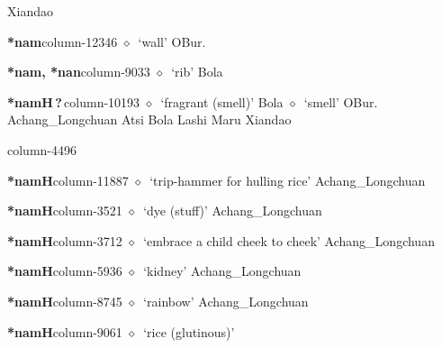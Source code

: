          Xiandao 
  \item {\footnotesize \textbf{*nam}}{\tiny column-12346}
         $\diamond$~`wall'
         OBur. 
  \item {\footnotesize \textbf{*nam, *nan}}{\tiny column-9033}
         $\diamond$~`rib'
         Bola 
  \item {\footnotesize \textbf{*namH\,?\,}}{\tiny column-10193}
         $\diamond$~`fragrant (smell)'
         Bola 
\hspace{1ex}
         $\diamond$~`smell'
         OBur. 
\hspace{1ex}
         Achang\_Longchuan 
\hspace{1ex}
         Atsi 
\hspace{1ex}
         Bola 
\hspace{1ex}
         Lashi 
\hspace{1ex}
         Maru 
\hspace{1ex}
         Xiandao 
  \item {\footnotesize \textbf{}}{\tiny column-4496}
  \item {\footnotesize \textbf{*namH}}{\tiny column-11887}
         $\diamond$~`trip-hammer for hulling rice'
         Achang\_Longchuan 
  \item {\footnotesize \textbf{*namH}}{\tiny column-3521}
         $\diamond$~`dye (stuff)'
         Achang\_Longchuan 
  \item {\footnotesize \textbf{*namH}}{\tiny column-3712}
         $\diamond$~`embrace a child cheek to cheek'
         Achang\_Longchuan 
  \item {\footnotesize \textbf{*namH}}{\tiny column-5936}
         $\diamond$~`kidney'
         Achang\_Longchuan 
  \item {\footnotesize \textbf{*namH}}{\tiny column-8745}
         $\diamond$~`rainbow'
         Achang\_Longchuan 
  \item {\footnotesize \textbf{*namH}}{\tiny column-9061}
         $\diamond$~`rice (glutinous)'

